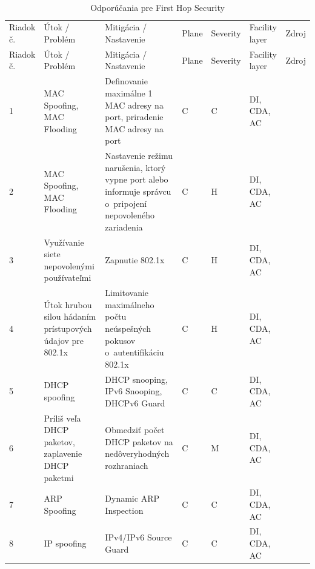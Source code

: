 \
\begin{longtable}[!htbp]{|C{2.5em}L{11em}L{11em}C{2.5em}C{4em}C{5em}L{2.5em}|}
	
	\caption{Odporúčania pre First Hop Security}
	\label{tab:fhs}\\ \hline
	\mbox{Riadok} č.&Útok / Problém	&Mitigácia / Nastavenie	&Plane	&Severity	&Facility layer	&Zdroj\\ \hhline{=======}
	\endfirsthead 
	\hline
	\centering
	
	Riadok č.	&Útok / Problém	&Mitigácia / Nastavenie	&Plane	&Severity	&Facility layer	&Zdroj\\ \hhline{=======}
	\endhead
	
	 1	&MAC Spoofing, MAC Flooding 	&Definovanie maximálne 1 MAC adresy na port, priradenie MAC adresy na port	&C	&C	&DI,
	CDA,
	AC	& \cite{Lammle2013}\\
	2	&MAC Spoofing, MAC Flooding 	&Nastavenie režimu narušenia, ktorý vypne port alebo informuje správcu o~pripojení nepovoleného zariadenia	&C	&H	&DI,
	CDA,
	AC	& \cite{Lammle2013}\\
	 3	&Využívanie siete nepovolenými používateľmi	&Zapnutie 802.1x 	&C	&H	&DI,
	CDA,
	AC	& \cite{Vyncke2008}
	
	\cite{Bouska20071}
	
	\cite{Bouska2007} \\
	4	&Útok hrubou silou hádaním prístupových údajov pre 802.1x 	&Limitovanie maximálneho počtu neúspešných pokusov o~autentifikáciu 802.1x	&C	&H	&DI,
	CDA,
	AC	& \cite{Vyncke2008}
	
	\cite{Bouska20071}
	
	\cite{Bouska2007} \\
	 5	&DHCP spoofing	&DHCP snooping, IPv6 Snooping, DHCPv6 Guard	&C	&C	&DI,
	CDA,
	AC	& \cite{Vyncke2008}
	
	\cite{Singh2018} 
	
	\cite{zXCpMaLbN1J7D1z2}\\
	6	&Príliš veľa DHCP paketov, zaplavenie DHCP paketmi	&Obmedziť počet DHCP paketov na nedôveryhodných rozhraniach	&C	&M	&DI,
	CDA,
	AC	& \cite{Vyncke2008}
	
	\cite{Singh2018}
	
	\cite{zXCpMaLbN1J7D1z2}\\
	 7	&ARP Spoofing	&Dynamic ARP Inspection	&C	&C	&DI,
	CDA,
	AC	& \cite{McMillan2018}\\
	8	&IP spoofing	&IPv4/IPv6 Source Guard	&C	&C	&DI,
	CDA,
	AC	& \cite{Singh2018}
	

\end{longtable}
